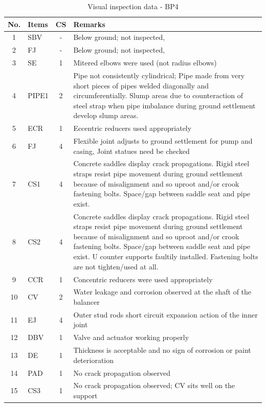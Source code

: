 \begin{table}[!h]
	\caption{Visual inspection data - BP4}
	\label{ch04_visualinspectionbp4}
		{\scriptsize
\begin{tabular}{c|l|c|p{12cm}}
\hline
No. & Items & CS & Remarks \\ 
\hline
1 & SBV & - & Below ground; not inspected,  \\ 
2 & FJ & - & Below ground; not inspected, \\ 
3 & SE & 1 & Mitered elbows were used (not radius elbows) \\ 
4 & PIPE1 & 2 & Pipe not consistently cylindrical; Pipe made from very short pieces of pipes welded diagonally and circumferentially. Slump areas due to counteraction of steel strap when pipe imbalance during ground settlement develop slump areas. \\ 
5 & ECR & 1 & Eccentric reducers used appropriately \\ 
6 & FJ & 4 & Flexible joint adjusts to ground settlement for pump and casing, Joint statues need be checked \\ 
7 & CS1 & 4 & Concrete saddles display crack propagations. Rigid steel straps resist pipe movement during ground settlement because of misalignment and so uproot and/or crook fastening bolts. Space/gap between saddle seat and pipe exist. \\ 
8 & CS2 & 4 & Concrete saddles display crack propagations. Rigid steel straps resist pipe movement during ground settlement because of misalignment and so uproot and/or crook fastening bolts. Space/gap between saddle seat and pipe exist. U counter supports faultily installed. Fastening bolts are not tighten/used at all. \\ 
9 & CCR & 1 & Concentric reducers were used appropriately \\ 
10 & CV & 2 & Water leakage and corrosion observed at the shaft of the balancer \\ 
11 & EJ & 4 & Outer stud rods short circuit expansion action of the inner joint \\ 
12 & DBV & 1 & Valve and actuator working properly  \\ 
13 & DE & 1 & Thickness is acceptable and no sign of corrosion or paint deterioration \\ 
14 & PAD & 1 & No crack propagation observed \\ 
15 & CS3 & 1 & No crack propagation observed; CV sits well on the support  \\ 
\hline
\end{tabular}
	}
\end{table}

